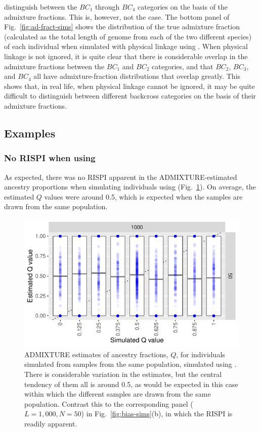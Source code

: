 {distinguish between the $BC_1$ through $BC_4$ categories on the basis of the admixture fractions.
This is, however, not the case.  The bottom panel of Fig.~\ref{fig:ad-fract-sims} shows the distribution
of the true admixture fraction (calculated as the total length of genome from each of the two
different species) of each individual when simulated with physical linkage using \gscramble{}.
When physical linkage is not ignored, it is quite clear that there is considerable overlap in the
admixture fractions between the $BC_1$ and $BC_2$ categories, and that $BC_2$, $BC_3$, and 
$BC_4$ all have admixture-fraction distributions that overlap greatly.  This shows that,
in real life, when physical linkage cannot be ignored, it may be quite difficult to distinguish
between different backcross categories on the basis of their admixture fractions.



\subsection*{Examples}

\subsubsection*{No RISPI when using \gscramble{}}

As expected, there was no RISPI apparent in the ADMIXTURE-estimated
ancestry proportions  when simulating individuals
using \gscramble{} (Fig.~\ref{fig:norispi}).  On average, the estimated $Q$ values
were around 0.5, which is expected when the samples are drawn from the same
population.
\begin{figure}
\newcommand{\gssimcap}{\footnotesize ADMIXTURE estimates of ancestry
fractions, $Q$, for individuals simulated from samples from the same population,
simulated using \gscramble{}.  There is considerable variation in the estimates,
but the central tendency of them all is around 0.5, as would be expected in this case
within which the different
samples are drawn from the same population.  Contrast this to the corresponding panel ($L=1,000, N=50$) in Fig.~\ref{fig:bias-sims}(b),
in which the RISPI is readily apparent.}
\includegraphics[width=\columnwidth]{figures/gscram_supervised_Qs.pdf}
\caption[\gssimcap]{\gssimcap}
\label{fig:norispi}
\end{figure}

}
